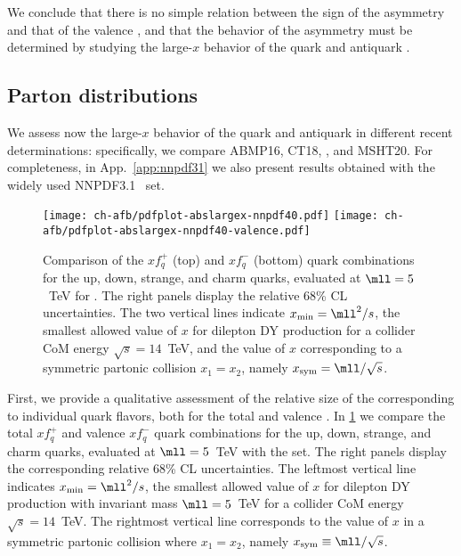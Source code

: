We conclude that there
is no simple relation between the sign of the asymmetry and that of
the valence \pdf, and that the
behavior of the asymmetry must be determined by studying the large-$x$
behavior of the quark and antiquark \pdfs.

\subsection{Parton distributions}
\label{sec:subsec-largexPDFs}

We assess now the large-$x$ behavior of
the quark and antiquark \pdfs in different recent \pdf
determinations: specifically, we compare
 ABMP16,
 CT18,  ,
 and MSHT20.
%
 For
completeness, in App.~\ref{app:nnpdf31} we also present results
obtained with the widely used NNPDF3.1~\cite{Ball:2017nwa} set.

\begin{figure}[!t]
 \centering
 \texttt{[image: ch-afb/pdfplot-abslargex-nnpdf40.pdf]}
 \texttt{[image: ch-afb/pdfplot-abslargex-nnpdf40-valence.pdf]}
 \caption{\small Comparison of the $xf^+_q$ (top) and $xf_q^-$ (bottom) quark
   \pdf combinations for the up, down, strange, and charm quarks,
   evaluated at $\mll=5$~TeV for  \nnlo.
   The right panels display the relative 68\% CL uncertainties.
   The two vertical lines indicate $x_{\rm min}=\mll^2/s$, the
   smallest allowed value of $x$ 
   for dilepton DY production for a collider
   CoM energy $\sqrt{s}=14$~TeV, and the value of $x$
   corresponding to a symmetric partonic collision $x_1=x_2$, namely
 $x_{\rm  sym}=\mll/\sqrt{s}$.
 }    
 \label{fig:pdfplot-abslargex}
\end{figure}

First, we provide a qualitative assessment of the relative size of the
\pdfs corresponding to
individual quark flavors, both for the total and valence \pdfs.
In \cref{fig:pdfplot-abslargex} we
compare  the total $xf^+_q$ and valence $xf_q^-$  quark
   \pdf combinations for the up, down, strange, and charm quarks,
   evaluated at $\mll=5$~TeV with the  \nnlo \pdf set.
   The right panels display the corresponding relative 68\% CL uncertainties.
  The leftmost vertical line indicates $x_{\rm min}=\mll^2/s$, the
  smallest allowed value of $x$ 
   for dilepton DY production with invariant mass $\mll=5$~TeV for a collider
   CoM energy $\sqrt{s}=14$~TeV.
   The rightmost vertical line corresponds to
   the value of $x$ in a symmetric partonic collision where $x_1=x_2$, namely
   $x_{\rm  sym}\equiv\mll/\sqrt{s}$.

